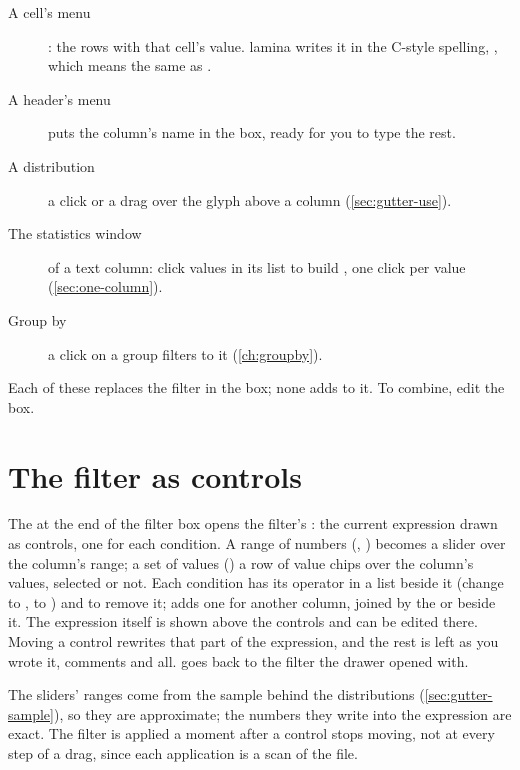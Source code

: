 \begin{description}
\item[A cell's menu] : the rows with that cell's value. lamina writes it in
the C-style spelling, , which means the same as \code{=}.
\item[A header's menu]  puts the column's name in the box, ready for you to type
the rest.
\item[A distribution] a click or a drag over the glyph above a column (\cref{sec:gutter-use}).
\item[The statistics window] of a text column: click values in its list to build , one click per value (\cref{sec:one-column}).
\item[Group by] a click on a group filters to it (\cref{ch:groupby}).
\end{description}

Each of these replaces the filter in the box; none adds to it. To combine, edit the box.

\section{The filter as controls}\label{sec:drawer}

The  at the end of the filter box opens the filter's : the current expression drawn as
controls, one for each condition. A range of numbers (,
) becomes a slider over the column's range; a set of values () a
row of value chips over the column's values, selected or not. Each condition has its operator in a list
beside it (change  to \ui{>=},  to ) and  to remove it;  adds one for another column, joined by the  or  beside it. The expression itself
is shown above the controls and can be edited there. Moving a control rewrites that part of the expression,
and the rest is left as you wrote it, comments and all.  goes back to the filter the drawer
opened with.


The sliders' ranges come from the sample behind the distributions (\cref{sec:gutter-sample}), so they
are approximate; the numbers they write into the expression are exact. The filter is applied a moment
after a control stops moving, not at every step of a drag, since each application is a scan of the file.

